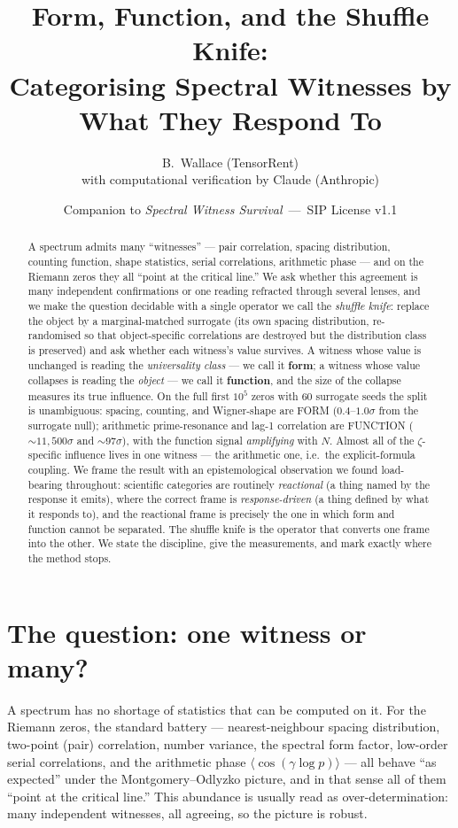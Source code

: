 \documentclass[11pt]{article}
\title{\textbf{Form, Function, and the Shuffle Knife:\\
Categorising Spectral Witnesses by What They Respond To}}
\author{B.\ Wallace \quad (TensorRent)\\ \small with computational verification by Claude (Anthropic)}
\date{\small Companion to \textit{Spectral Witness Survival}\ ---\ SIP License v1.1}
\begin{document}
\maketitle

\begin{abstract}
A spectrum admits many ``witnesses'' --- pair correlation, spacing distribution, counting function, shape statistics, serial correlations, arithmetic phase --- and on the Riemann zeros they all ``point at the critical line.'' We ask whether this agreement is many independent confirmations or one reading refracted through several lenses, and we make the question decidable with a single operator we call the \emph{shuffle knife}: replace the object by a marginal-matched surrogate (its own spacing distribution, re-randomised so that object-specific correlations are destroyed but the distribution class is preserved) and ask whether each witness's value survives. A witness whose value is unchanged is reading the \emph{universality class} --- we call it \textbf{form}; a witness whose value collapses is reading the \emph{object} --- we call it \textbf{function}, and the size of the collapse measures its true influence. On the full first $10^5$ zeros with $60$ surrogate seeds the split is unambiguous: spacing, counting, and Wigner-shape are FORM ($0.4$--$1.0\sigma$ from the surrogate null); arithmetic prime-resonance and lag-1 correlation are FUNCTION ($\sim\!11{,}500\sigma$ and $\sim\!97\sigma$), with the function signal \emph{amplifying} with $N$. Almost all of the $\zeta$-specific influence lives in one witness --- the arithmetic one, i.e.\ the explicit-formula coupling. We frame the result with an epistemological observation we found load-bearing throughout: scientific categories are routinely \emph{reactional} (a thing named by the response it emits), where the correct frame is \emph{response-driven} (a thing defined by what it responds to), and the reactional frame is precisely the one in which form and function cannot be separated. The shuffle knife is the operator that converts one frame into the other. We state the discipline, give the measurements, and mark exactly where the method stops.
\end{abstract}

\section{The question: one witness or many?}

A spectrum has no shortage of statistics that can be computed on it. For the Riemann zeros, the standard battery --- nearest-neighbour spacing distribution, two-point (pair) correlation, number variance, the spectral form factor, low-order serial correlations, and the arithmetic phase $\langle\cos(\gamma\log p)\rangle$ --- all behave ``as expected'' under the Montgomery--Odlyzko picture, and in that sense all of them ``point at the critical line.'' This abundance is usually read as over-determination: many independent witnesses, all agreeing, so the picture is robust.
\end{document}
